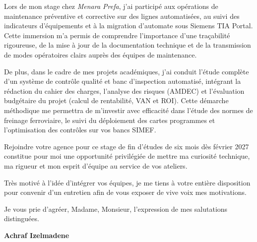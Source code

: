 \documentclass[10pt,a4paper]{altacv}
\begin{document}
Lors de mon stage chez \textit{Menara Prefa}, j'ai participé aux opérations de maintenance préventive et corrective sur des lignes automatisées, au suivi des indicateurs d'équipements et à la migration d'automate sous Siemens TIA Portal. Cette immersion m'a permis de comprendre l'importance d'une traçabilité rigoureuse, de la mise à jour de la documentation technique et de la transmission de modes opératoires clairs auprès des équipes de maintenance. 

De plus, dans le cadre de mes projets académiques, j'ai conduit l'étude complète d'un système de contrôle qualité et banc d'inspection automatisé, intégrant la rédaction du cahier des charges, l'analyse des risques (AMDEC) et l'évaluation budgétaire du projet (calcul de rentabilité, VAN et ROI). Cette démarche méthodique me permettra de m'investir avec efficacité dans l'étude des normes de freinage ferroviaire, le suivi du déploiement des cartes programmes et l'optimisation des contrôles sur vos bancs SIMEF.

Rejoindre votre agence pour ce stage de fin d'études de six mois dès février 2027 constitue pour moi une opportunité privilégiée de mettre ma curiosité technique, ma rigueur et mon esprit d'équipe au service de vos ateliers.

Très motivé à l'idée d'intégrer vos équipes, je me tiens à votre entière disposition pour convenir d'un entretien afin de vous exposer de vive voix mes motivations.

Je vous prie d'agréer, Madame, Monsieur, l'expression de mes salutations distinguées.

\vspace{16pt}

\begin{flushright}
  \large\color{emphasis}\textbf{Achraf Izelmadene}
\end{flushright}
\end{document}
